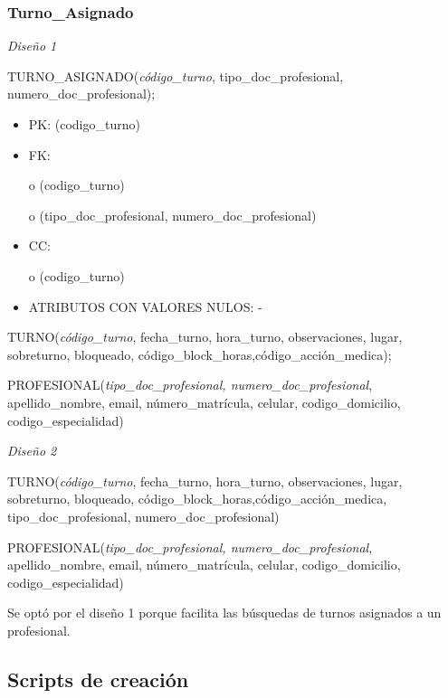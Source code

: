 \documentclass[a4paper,11pt]{article}
\begin{document}
\subsubsection{\textbf{Turno\_Asignado}}

\textit{Diseño 1}

TURNO\_ASIGNADO(\emph{código\_turno}, tipo\_doc\_profesional, numero\_doc\_profesional);

\begin{itemize}
\item PK: (codigo\_turno)

\item FK: 

o (codigo\_turno)

o (tipo\_doc\_profesional, numero\_doc\_profesional)

\item CC:

o (codigo\_turno)

\item ATRIBUTOS CON VALORES NULOS: -
\end{itemize}

TURNO(\emph{código\_turno}, fecha\_turno, hora\_turno, observaciones, lugar, sobreturno, 
bloqueado, código\_block\_horas,código\_acción\_medica);

PROFESIONAL(\emph{tipo\_doc\_profesional, numero\_doc\_profesional}, apellido\_nombre, 
email, número\_matrícula, celular,\textit{\textbf{ }}codigo\_domicilio, codigo\_especialidad)

\textit{Diseño 2}

TURNO(\emph{código\_turno}, fecha\_turno, hora\_turno, observaciones, lugar, sobreturno, 
bloqueado, código\_block\_horas,código\_acción\_medica, tipo\_doc\_profesional, 
numero\_doc\_profesional)

PROFESIONAL(\emph{tipo\_doc\_profesional, numero\_doc\_profesional}, apellido\_nombre, 
email, número\_matrícula, celular,\textit{\textbf{ }}codigo\_domicilio, codigo\_especialidad)

Se optó por el diseño 1 porque facilita las búsquedas de turnos asignados a 
un profesional.\pagebreak{}\label{HToc293405855}

\newpage

\subsection{Scripts de creación}

\end{document}
